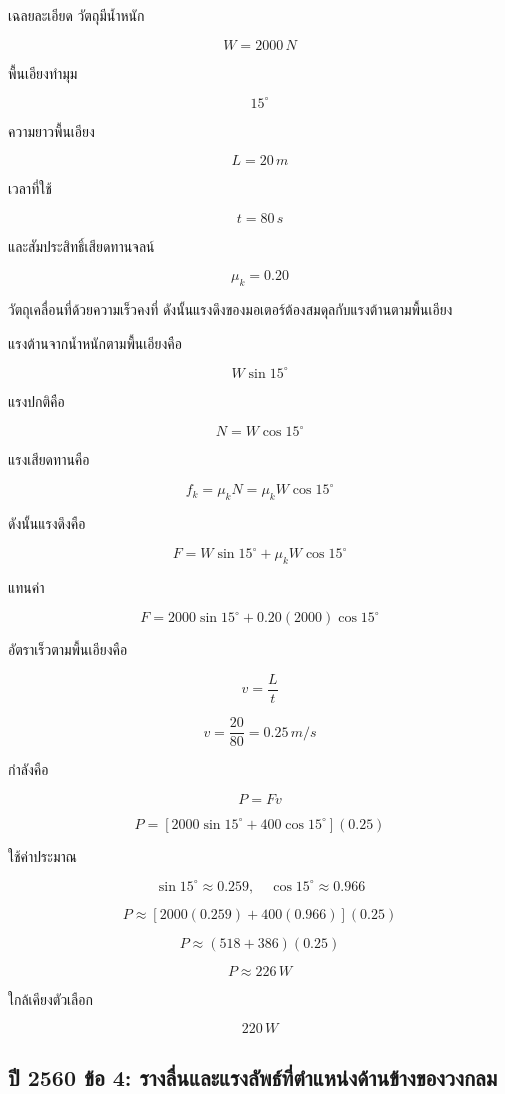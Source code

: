 \begin{examplebox}{เฉลยละเอียด}
วัตถุมีน้ำหนัก

\[
W=2000\,\si{N}
\]

พื้นเอียงทำมุม

\[
15^\circ
\]

ความยาวพื้นเอียง

\[
L=20\,\si{m}
\]

เวลาที่ใช้

\[
t=80\,\si{s}
\]

และสัมประสิทธิ์เสียดทานจลน์

\[
\mu_k=0.20
\]

วัตถุเคลื่อนที่ด้วยความเร็วคงที่ ดังนั้นแรงดึงของมอเตอร์ต้องสมดุลกับแรงต้านตามพื้นเอียง

แรงต้านจากน้ำหนักตามพื้นเอียงคือ

\[
W\sin15^\circ
\]

แรงปกติคือ

\[
N=W\cos15^\circ
\]

แรงเสียดทานคือ

\[
f_k=\mu_kN=\mu_kW\cos15^\circ
\]

ดังนั้นแรงดึงคือ

\[
F=W\sin15^\circ+\mu_kW\cos15^\circ
\]

แทนค่า

\[
F=2000\sin15^\circ+0.20(2000)\cos15^\circ
\]

อัตราเร็วตามพื้นเอียงคือ

\[
v=\frac{L}{t}
\]

\[
v=\frac{20}{80}=0.25\,\si{m/s}
\]

กำลังคือ

\[
P=Fv
\]

\[
P=\left[2000\sin15^\circ+400\cos15^\circ\right](0.25)
\]

ใช้ค่าประมาณ

\[
\sin15^\circ\approx 0.259,\quad \cos15^\circ\approx 0.966
\]

\[
P\approx [2000(0.259)+400(0.966)](0.25)
\]

\[
P\approx (518+386)(0.25)
\]

\[
P\approx 226\,\si{W}
\]

ใกล้เคียงตัวเลือก

\[
\boxed{220\,\si{W}}
\]
\end{examplebox}

\subsection{ปี 2560 ข้อ 4: รางลื่นและแรงลัพธ์ที่ตำแหน่งด้านข้างของวงกลม}

